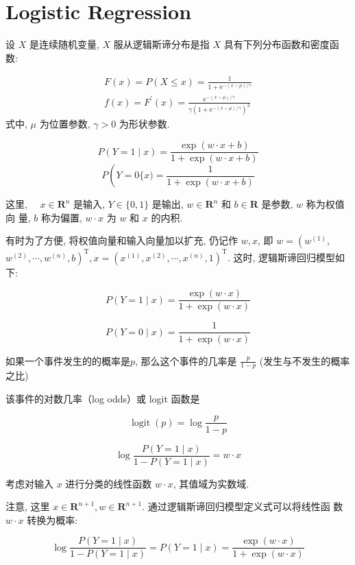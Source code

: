 \chapter{Logistic Regression}

\begin{definition}
    设 $ X $ 是连续随机变量, $ X $ 服从逻辑斯谛分布是指 $ X $ 具有下列分布函数和密度函数:

    $$
\begin{array}{l}
F(x)=P(X \leqslant x)=\frac{1}{1+\mathrm{e}^{-(x-\mu) / \gamma}} \\
f(x)=F^{\prime}(x)=\frac{\mathrm{e}^{-(x-\mu) / \gamma}}{\gamma\left(1+\mathrm{e}^{-(x-\mu) / \gamma}\right)^{2}}
\end{array}
$$
式中, $ \mu $ 为位置参数, $ \gamma>0 $ 为形状参数.
\end{definition}



\begin{definition}
    $$ P(Y=1 \mid x)=\frac{\exp (w \cdot x+b)}{1+\exp (w \cdot x+b)} $$
$$ P\left(Y=0\{x)=\frac{1}{1+\exp (w \cdot x+b)}\right. $$

这里, $\quad x \in \mathbf{R}^{n}$ 是输入, $Y \in\{0,1\}$ 是输出, $w \in \mathbf{R}^{n}$ 和 $b \in \mathbf{R}$ 是参数, $w$ 称为权值向 量, $b$ 称为偏置, $w \cdot x$ 为 $w$ 和 $x$ 的内积.
\end{definition}

有时为了方便, 将权值向量和输入向量加以扩充, 仍记作 $ w, x $, 即 $ w=\left(w^{(1)}\right. $, $ \left.w^{(2)}, \cdots, w^{(n)}, b\right)^{\mathrm{T}}, x=\left(x^{(1)}, x^{(2)}, \cdots, x^{(n)}, 1\right)^{\mathrm{T}} $. 这时, 逻辑斯谛回归模型如下:

$$ P(Y=1 \mid x)=\frac{\exp (w \cdot x)}{1+\exp (w \cdot x)} $$

$$ P(Y=0 \mid x)=\frac{1}{1+\exp (w \cdot x)} $$

\begin{definition}[几率]
    如果一个事件发生的的概率是$p$, 那么这个事件的几率是 $ \frac{p}{1-p} $ (发生与不发生的概率之比)
\end{definition}

该事件的对数几率（log odds）或 logit 函数是

$$ \operatorname{logit}(p)=\log \frac{p}{1-p} $$

$$ \log \frac{P(Y=1 \mid x)}{1-P(Y=1 \mid x)}=w \cdot x $$

考虑对输入 $ x $ 进行分类的线性函数 $ w \cdot x $, 其值域为实数域.

注意, 这里 $ x \in \mathbf{R}^{n+1}, w \in \mathbf{R}^{n+1} $. 通过逻辑斯谛回归模型定义式可以将线性函 数 $ w \cdot x $ 转换为概率:

$$\log \frac{P(Y=1 \mid x)}{1-P(Y=1 \mid x)}= P(Y=1 \mid x)=\frac{\exp (w \cdot x)}{1+\exp (w \cdot x)} $$